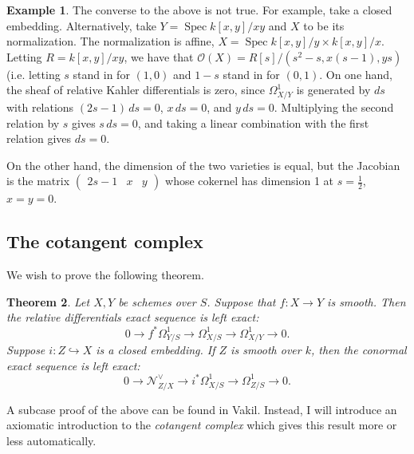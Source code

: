 \documentclass[10pt]{article}
\newtheorem{thm}{Theorem}[section]
\theoremstyle{definition}
\newtheorem{exmp}[thm]{Example}
\DeclareMathOperator{\Spec}{Spec}
\newcommand{\OO}{\mathcal{O}}
\newcommand{\todo}[1]{\textbf{\textcolor{red}{TODO #1}}}
\begin{document}
\begin{exmp}
The converse to the above is not true.  For example, take a closed embedding.  Alternatively, take $Y = \Spec k[x,y]/xy$ and $X$ to be its normalization.  The normalization is affine, $X = \Spec k[x,y]/y \times k[x,y]/x$.  Letting $R = k[x,y]/xy$, we have that $\OO(X) = R[s]/(s^2 - s, x(s-1), ys)$ (i.e. letting $s$ stand in for $(1, 0)$ and $1-s$ stand in for $(0, 1)$.  On one hand, the sheaf of relative Kahler differentials is zero, since $\Omega^1_{X/Y}$ is generated by $ds$ with relations $(2s-1)\, ds = 0$, $x \, ds = 0$, and $y\,ds=0$.  Multiplying the second relation by $s$ gives $s \, ds = 0$, and taking a linear combination with the first relation gives $ds = 0$.

On the other hand, the dimension of the two varieties is equal, but the Jacobian  is the matrix $\begin{pmatrix} 2s-1 & x & y\end{pmatrix}$ whose cokernel has dimension 1 at $s = \frac 1 2$, $x=y=0$.
\end{exmp}




\subsection{The cotangent complex}






We wish to prove the following theorem.
\begin{thm}
Let $X, Y$ be schemes over $S$.  Suppose that $f: X \rightarrow Y$ is smooth.  Then the relative differentials exact sequence is left exact:
$$0 \rightarrow f^* \Omega^1_{Y/S} \rightarrow \Omega^1_{X/S} \rightarrow \Omega^1_{X/Y} \rightarrow 0.$$
Suppose $i: Z \hookrightarrow X$ is a closed embedding.  If $Z$ is smooth over $k$, then the conormal exact sequence is left exact:
$$0 \rightarrow \mathcal{N}^\vee_{Z/X} \rightarrow i^* \Omega^1_{X/S} \rightarrow \Omega^1_{Z/S} \rightarrow 0.$$
\end{thm}
A subcase proof of the above can be found in Vakil.  Instead, I will introduce an axiomatic introduction to the \emph{cotangent complex} which gives this result more or less automatically.

%
%
%
\end{document}
